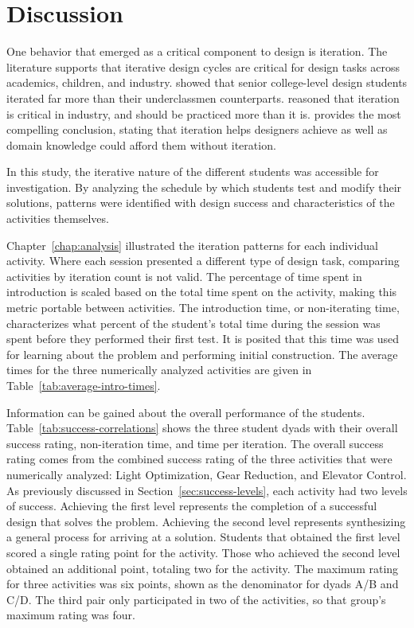 \chapter{Discussion}
One behavior that emerged as a critical component to design is iteration. The literature supports that iterative design cycles are critical for design tasks across academics, children, and industry. \citet{atman-1999} showed that senior college-level design students iterated far more than their underclassmen counterparts. \citet{eckert09} reasoned that iteration is critical in industry, and should be practiced more than it is. \citet{dow09} provides the most compelling conclusion, stating that iteration helps designers achieve as well as domain knowledge could afford them without iteration. 

In this study, the iterative nature of the different students was accessible for investigation. By analyzing the schedule by which students test and modify their solutions, patterns were identified with design success and characteristics of the activities themselves. 

Chapter~\ref{chap:analysis} illustrated the iteration patterns for each individual activity. Where each session presented a different type of design task, comparing activities by iteration count is not valid. The percentage of time spent in introduction is scaled based on the total time spent on the activity, making this metric portable between activities. The introduction time, or non-iterating time, characterizes what percent of the student's total time during the session was spent before they performed their first test. It is posited that this time was used for learning about the problem and performing initial construction. The average times for the three numerically analyzed activities are given in Table~\ref{tab:average-intro-times}. 

Information can be gained about the overall performance of the students. Table~\ref{tab:success-correlations} shows the three student dyads with their overall success rating, non-iteration time, and time per iteration. The overall success rating comes from the combined success rating of the three activities that were numerically analyzed: Light Optimization, Gear Reduction, and Elevator Control. As previously discussed in Section~\ref{sec:success-levels}, each activity had two levels of success. Achieving the first level represents the completion of a successful design that solves the problem. Achieving the second level represents synthesizing a general process for arriving at a solution. Students that obtained the first level scored a single rating point for the activity. Those who achieved the second level obtained an additional point, totaling two for the activity. The maximum rating for three activities was six points, shown as the denominator for dyads A/B and C/D. The third pair only participated in two of the activities, so that group's maximum rating was four. 

